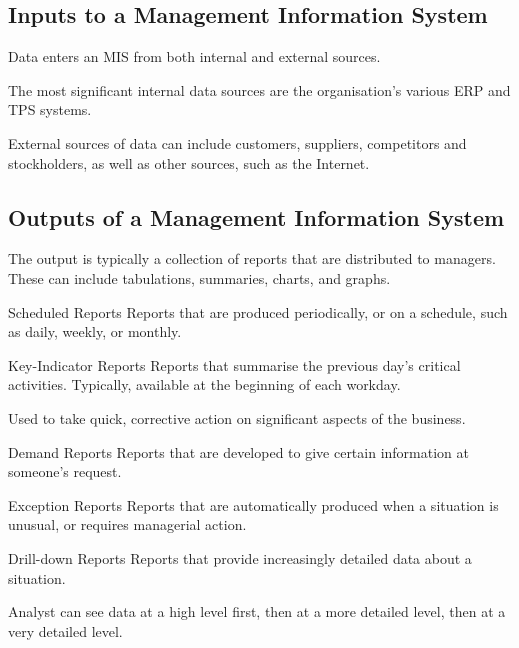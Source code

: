 \documentclass[\main/notes.tex]{subfiles}
\begin{document}
			\subsection{Inputs to a Management Information System}
				Data enters an MIS from both internal and external sources.

				The most significant internal data sources are the organisation's various ERP and TPS systems.

				External sources of data can include customers, suppliers, competitors and stockholders, as well as other sources, such as the Internet.
			\subsection{Outputs of a Management Information System}
				The output is typically a collection of reports that are distributed to managers. These can include tabulations, summaries, charts, and graphs.
				\begin{definition}{Scheduled Reports}
					Reports that are produced periodically, or on a schedule, such as daily, weekly, or monthly.
				\end{definition}
				\begin{definition}{Key-Indicator Reports}
					Reports that summarise the previous day's critical activities. Typically, available at the beginning of each workday.

					Used to take quick, corrective action on significant aspects of the business.
				\end{definition}
				\begin{definition}{Demand Reports}
					Reports that are developed to give certain information at someone's request.
				\end{definition}
				\begin{definition}{Exception Reports}
					Reports that are automatically produced when a situation is unusual, or requires managerial action.
				\end{definition}
				\begin{definition}{Drill-down Reports}
					Reports that provide increasingly detailed data about a situation.

					Analyst can see data at a high level first, then at a more detailed level, then at a very detailed level.
				\end{definition}
\end{document}
